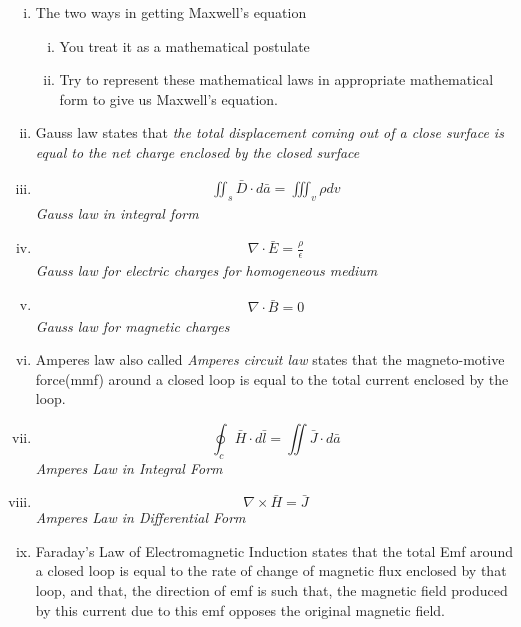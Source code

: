 \begin{mdframed}[backgroundcolor=lightblue, linewidth=1pt, hidealllines=true]
\begin{enumerate}[(i)]
	\item The two ways in getting Maxwell's equation
	\begin{enumerate}[(i)]
		\item	You treat it as a mathematical postulate
		\item	Try to represent these mathematical laws in appropriate mathematical form to give us Maxwell's equation.
	\end{enumerate}
	
	\item Gauss law states that \emph{the total displacement coming out of a close surface is equal to the net charge enclosed by the closed surface}
	
	\item \begin{align*}
		\iint_s\bar{D}\cdot{d\bar{a}} = \iiint_v\rho dv
	\end{align*}
	\emph{Gauss law in integral form}
	
	\item \begin{align*} 
		\nabla \cdot \bar{E} = \frac{\rho}{\epsilon}
	\end{align*} 
	\emph{Gauss law for electric charges for homogeneous medium}
	
	\item \begin{align*}
		\nabla \cdot \bar{B} = 0
	\end{align*}
	\emph{Gauss law for magnetic charges}
	
	\item Amperes law also called \emph{Amperes circuit law} states that the magneto-motive force(mmf) around a closed loop is equal to the total current enclosed by the loop.
	
	\item \begin{equation*}
		\oint_c\bar{H} \cdot d\bar{l} = \iint\bar{J} \cdot d\bar{a}
	\end{equation*}
	\emph{Amperes Law in Integral Form}
	
	\item \begin{equation*}
		\boxed{\nabla \times \bar{H} = \bar{J}}
	\end{equation*}
	\emph{Amperes Law in Differential Form}
	
	\item Faraday's Law of Electromagnetic Induction states that the total Emf around a closed loop is equal to the rate of change of magnetic flux enclosed by that loop, and that, the direction of emf is such that, the magnetic field produced by this current due to this emf opposes the original magnetic field. 
	

\end{enumerate}
\end{mdframed}
